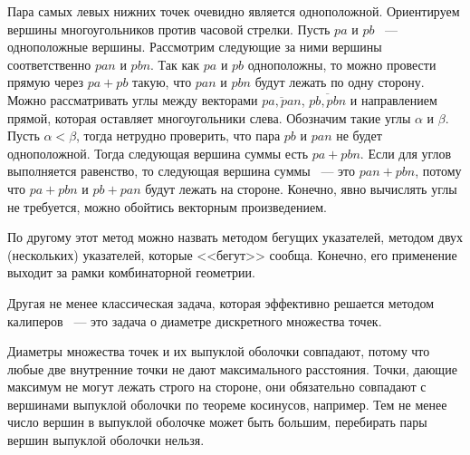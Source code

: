 Пара самых левых нижних точек очевидно является одноположной. Ориентируем
вершины многоугольников против часовой стрелки. Пусть $pa$ и $pb$ ~---
одноположные вершины. Рассмотрим следующие за ними вершины соответственно
$pan$ и $pbn$. Так как $pa$ и $pb$ одноположны, то можно провести прямую
через $pa + pb$ такую, что $pan$ и $pbn$ будут лежать по одну сторону.
Можно рассматривать углы между векторами $\overline{pa,pan}$,
$\overline{pb,pbn}$ и
направлением прямой, которая оставляет многоугольники слева. Обозначим
такие углы $\alpha$ и $\beta$. Пусть $\alpha < \beta$, тогда нетрудно
проверить, что пара $pb$ и $pan$ не будет одноположной. Тогда следующая
вершина суммы есть $pa + pbn$. Если для углов выполняется равенство,
то следующая вершина суммы ~--- это $pan + pbn$, потому что $pa + pbn$ и
$pb + pan$ будут лежать на стороне. Конечно, явно вычислять
углы не требуется, можно обойтись векторным произведением.

По другому этот метод можно назвать методом бегущих указателей,
методом двух (нескольких) указателей, которые <<бегут>> сообща.
Конечно, его применение выходит за рамки комбинаторной геометрии.

Другая не менее классическая задача, которая эффективно решается методом
калиперов ~--- это задача о диаметре дискретного множества точек.

Диаметры множества точек и их выпуклой оболочки совпадают,
потому что любые две внутренние точки не дают максимального
расстояния. Точки, дающие максимум не могут лежать строго на стороне,
они обязательно совпадают с вершинами выпуклой оболочки
по теореме косинусов, например. Тем не менее число вершин
в выпуклой оболочке может быть большим, перебирать
пары вершин выпуклой оболочки нельзя.\\

